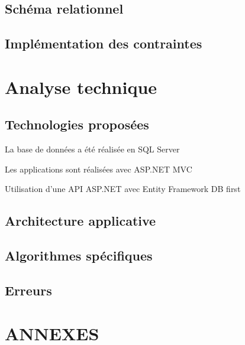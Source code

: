 \documentclass[a4paper,11pt]{article}
\begin{document}
	\subsection{Schéma relationnel}
	
	\subsection{Implémentation des contraintes}
	
	\newpage
	
	\section{Analyse technique}
	
	\subsection{Technologies proposées}
	
	La base de données a été réalisée en SQL Server
	
	Les applications sont réalisées avec ASP.NET MVC
	
	Utilisation d'une API ASP.NET avec Entity Framework DB first

	\subsection{Architecture applicative}

	\subsection{Algorithmes spécifiques}

	\subsection{Erreurs}

	\newpage
	
	\section{ANNEXES}
	
\end{document}
